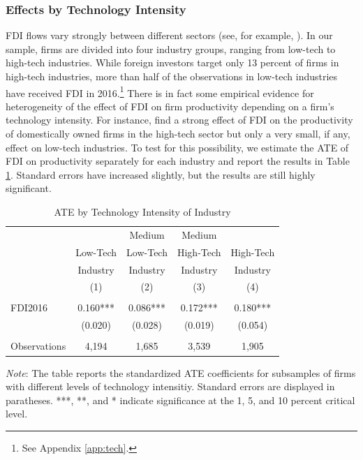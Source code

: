 \documentclass[a4paper,11pt]{scrartcl}
\begin{document}
\subsubsection*{Effects by Technology Intensity}

FDI flows vary strongly between different sectors (see, for example, \citet{Smarzynska2004, Keller2009, Haskel2007}). In our sample, firms are divided into four industry groups, ranging from low-tech to high-tech industries. While foreign investors target only 13 percent of firms in high-tech industries, more than half of the observations in low-tech industries have received FDI in 2016.\footnote{See Appendix \ref{app:tech}.} There is in fact some empirical evidence for heterogeneity of the effect of FDI on firm productivity depending on a firm's technology intensity. For instance, \citet{Keller2009} find a strong effect of FDI on the productivity of domestically owned firms in the high-tech sector but only a very small, if any, effect on low-tech industries. To test for this possibility, we estimate the ATE of FDI on productivity separately for each industry and report the results in Table \ref{tab:TECH}. Standard errors have increased slightly, but the results are still highly significant. 

\begin{table}[h!]
  \centering
   \caption{ATE by Technology Intensity of Industry}
   \label{tab:TECH}
\begin{threeparttable}
 
\begin{tabular}{lcccc}
 \hline
 \hline
 & & Medium & Medium &  \\ 
 & Low-Tech & Low-Tech & High-Tech & High-Tech \\ 
 & Industry & Industry & Industry & Industry \\ 
 & (1) & (2) & (3) & (4) \\
 \hline
 &  &  &  &  \\
FDI2016 & 0.160*** & 0.086*** & 0.172*** & 0.180*** \\
	      & (0.020) & (0.028) & (0.019) & (0.054) \\
	      &  &  &  &  \\
 Observations & 4,194 & 1,685 & 3,539 & 1,905 \\ 
	\hline
	\hline
\end{tabular}	

\begin{tablenotes}[flushleft]
     \footnotesize       
\item \textit{Note}: The table reports the standardized ATE coefficients for subsamples of firms with different levels of technology intensitiy. Standard errors are displayed in paratheses. ***, **, and * indicate significance at the 1, 5, and 10 percent critical level. 

\end{tablenotes}


\end{threeparttable}
\end{table}
\end{document}
